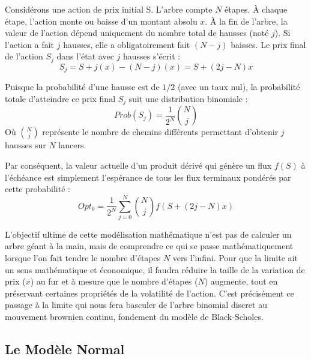 \begin{theorembox}
Considérons une action de prix initial S. L'arbre compte $N$ étapes. À chaque étape, l'action monte ou baisse d'un montant absolu $x$.
À la fin de l'arbre, la valeur de l'action dépend uniquement du nombre total de hausses (noté $j$). Si l'action a fait $j$ hausses, elle a obligatoirement fait $(N - j)$ baisses.
Le prix final de l'action $S_j$ dans l'état avec $j$ hausses s'écrit :
\begin{equation}
    \label{eq:fsec3-prix_sj}
    S_j = S + j(x) - (N - j)(x) = S + (2j - N)x
\end{equation}

Puisque la probabilité d'une hausse est de $1/2$ (avec un taux nul), la probabilité totale d'atteindre ce prix final $S_j$ suit une distribution binomiale :
\begin{equation}
    \label{eq:fsec3-prob_binom}
    Prob(S_j) = \frac{1}{2^N} \binom{N}{j}
\end{equation}
Où $\binom{N}{j}$ représente le nombre de chemins différents permettant d'obtenir $j$ hausses sur $N$ lancers.

Par conséquent, la valeur actuelle d'un produit dérivé qui génère un flux $f(S)$ à l'échéance est simplement l'espérance de tous les flux terminaux pondérés par cette probabilité :
\begin{equation}
    \label{eq:fsec3-prix_n_pas}
    Opt_0 = \frac{1}{2^N} \sum_{j=0}^{N} \binom{N}{j} f\left(S + (2j - N)x\right)
\end{equation}
\end{theorembox}

L'objectif ultime de cette modélisation mathématique n'est pas de calculer un arbre géant à la main, mais de comprendre ce qui se passe mathématiquement lorsque l'on fait tendre le nombre d'étapes $N$ vers l'infini. Pour que la limite ait un sens mathématique et économique, il faudra réduire la taille de la variation de prix ($x$) au fur et à mesure que le nombre d'étapes ($N$) augmente, tout en préservant certaines propriétés de la volatilité de l'action. C'est précisément ce passage à la limite qui nous fera basculer de l'arbre binomial discret au mouvement brownien continu, fondement du modèle de Black-Scholes.

\subsection{Le Modèle Normal}

